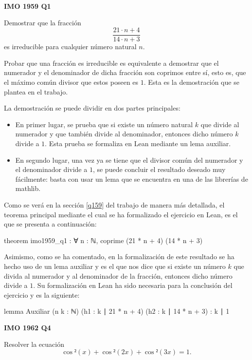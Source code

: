 \textbf{IMO 1959 Q1}

\noindent
Demostrar que la fracción
\[\frac{21⋅n+4}{14⋅n+3}\]
es irreducible para cualquier número natural \(n\).

Probar que una fracción es irreducible es equivalente a demostrar que el
numerador y el denominador de dicha fracción son coprimos entre sí, esto es,
que el máximo común divisor que estos poseen es \(1\). Esta es la demostración
que se plantea en el trabajo. 

La demostración se puede dividir en dos partes principales:
\begin{itemize}
\item En primer lugar, se prueba que si existe un número natural \(k\) que
  divide al numerador y que también divide al denominador, entonces dicho número
  \(k\) divide a \(1\). Esta prueba se formaliza en Lean mediante un lema auxiliar.

\item En segundo lugar, una vez ya se tiene que el divisor común del numerador y
  el denominador divide a \(1\), se puede concluir el resultado deseado muy
  fácilmente: basta con usar un lema que se encuentra en una de las librerías de
  mathlib.
\end{itemize}

Como se verá en la sección \ref{q159} del trabajo de manera más detallada, el
teorema principal mediante el cual se ha formalizado el ejercicio en Lean, es el
que se presenta a continuación:
\begin{leancode}
theorem imo1959_q1 : ∀ n : ℕ, coprime (21 * n + 4) (14 * n + 3)
\end{leancode}

Asimismo, como se ha comentado, en la formalización de este resultado se ha hecho
uso de un lema auxiliar y es el que nos dice que si existe un número \(k\) que
divida al numerador y al denominador de la fracción, entonces dicho número divide
a \(1\). Su formalización en Lean ha sido necesaria para la conclusión del
ejercicio y es la siguiente:
\begin{leancode}
lemma Auxiliar
  (n k : ℕ)
  (h1 : k ∣ 21 * n + 4)
  (h2 : k ∣ 14 * n + 3)
  : k ∣ 1
\end{leancode}

\textbf{IMO 1962 Q4}

\noindent
Resolver la ecuación
\begin{equation}\label{ecuacionq4}
  \cos²(x)+\cos²(2x)+\cos²(3x)=1.
\end{equation}

